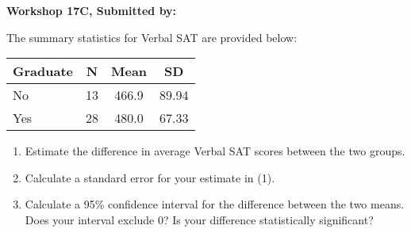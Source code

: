 \documentclass[11pt]{book}\usepackage[]{graphicx}\usepackage[]{color}
\begin{document}
\begin{exercises}
\begin{exercise}
\end{exercise}
\begin{solution}  %

\end{solution}

\clearpage

    \begin{exercise}  %

    \begin{center}
\begin{flushleft}\textbf{\large \hfill Workshop 17C, Submitted by: }\end{flushleft}

\end{center}

The summary statistics for Verbal SAT are provided below:

\begin{center}
\begin{tabular}{@{} lccc @{}} \hline
Graduate & N & Mean & SD \\ \hline
No & 13 & 466.9 & 89.94 \\
Yes & 28 & 480.0 & 67.33 \\ \hline
\end{tabular}
\end{center}

\begin{enumerate}
\item Estimate the difference in average Verbal SAT scores between the two groups.
\item Calculate a standard error for your estimate in (1).
\item Calculate a 95\% confidence interval for the difference between the two means. Does your interval exclude 0? Is your difference statistically significant?
\end{enumerate}


\end{exercise}
\end{exercises}
\end{document}
